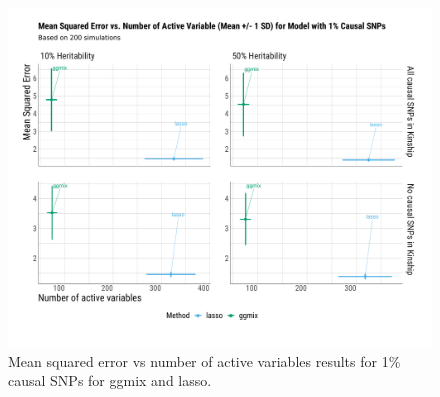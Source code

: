 \documentclass[12pt,letter]{article}\usepackage[]{graphicx}\usepackage[]{color}
\newenvironment{knitrout}{}{} %
\begin{document}
\begin{knitrout}\scriptsize
{}\color{fgcolor}\begin{figure}[H]

{\centering \includegraphics[width=1\linewidth]{figure/plot-mse-nactive-sim-1p-causal-zoom-in-1} 

}

\caption[Mean squared error vs number of active variables results for 1\% causal SNPs for ggmix and lasso]{Mean squared error vs number of active variables results for 1\% causal SNPs for ggmix and lasso.}\label{fig:plot-mse-nactive-sim-1p-causal-zoom-in}
\end{figure}


\end{knitrout}
\end{document}
